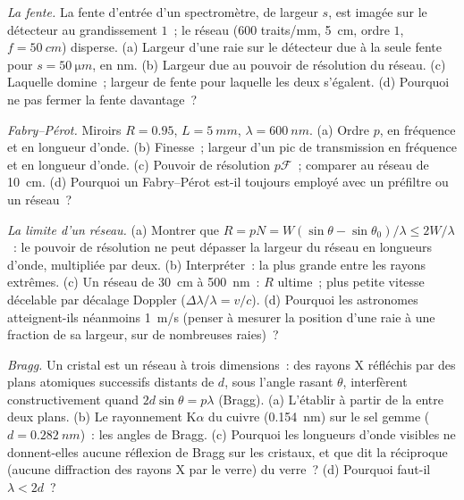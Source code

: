 \begin{exercise}[$\star\star$]\label{exo:b2:gratings:8}
\emph{La fente.} La fente d'entrée d'un spectromètre, de largeur $s$, est imagée
sur le détecteur au grandissement $1$~; le réseau ($600$ traits/mm,
\qty{5}{cm}, ordre $1$, $f = \qty{50}{cm}$) disperse. (a) Largeur d'une raie sur
le détecteur due à la seule fente pour $s = \qty{50}{\micro m}$, en nm. (b)
Largeur due au pouvoir de résolution du réseau. (c) Laquelle domine~; largeur de fente
pour laquelle les deux s'égalent. (d) Pourquoi ne pas fermer la fente davantage~?
\end{exercise}

\begin{exercise}[$\star\star$]\label{exo:b2:gratings:9}
\emph{Fabry--Pérot.} Miroirs $R = 0.95$, $L = \qty{5}{mm}$, $\lambda = \qty{600}{nm}$.
(a) Ordre $p$,  en fréquence et en longueur d'onde. (b)
Finesse~; largeur d'un pic de transmission en fréquence et en longueur d'onde. (c)
Pouvoir de résolution $p\mathcal F$~; comparer au réseau de \qty{10}{cm}. (d) Pourquoi
un Fabry--Pérot est-il toujours employé avec un préfiltre ou un réseau~?
\end{exercise}

\begin{exercise}[$\star\star\star$]\label{exo:b2:gratings:10}
\emph{La limite d'un réseau.} (a) Montrer que $R = pN = W(\sin\theta - \sin\theta_0)
/\lambda \le 2W/\lambda$~: le pouvoir de résolution ne peut dépasser la largeur du
réseau en longueurs d'onde, multipliée par deux. (b) Interpréter~: la plus grande  entre les rayons extrêmes. (c) Un réseau de \qty{30}{cm} à
\qty{500}{nm}~: $R$ ultime~; plus petite vitesse décelable par décalage Doppler
($\Delta\lambda/\lambda = v/c$). (d) Pourquoi les astronomes atteignent-ils néanmoins \qty{1}{m/s}
(penser à mesurer la position d'une raie à une fraction de sa largeur,
sur de nombreuses raies)~?
\end{exercise}

\begin{exercise}[$\star\star\star$]\label{exo:b2:gratings:11}
\emph{Bragg.} Un cristal est un réseau à trois dimensions~: des rayons X
réfléchis par des plans atomiques successifs distants de $d$, sous
l'angle rasant $\theta$, interfèrent constructivement quand $2d\sin\theta = p\lambda$
(Bragg). (a) L'établir à partir de la  entre deux plans.
(b) Le rayonnement K$\alpha$ du cuivre (\qty{0.154}{nm}) sur le sel gemme ($d = \qty{0.282}{nm}$)~:
les angles de Bragg. (c) Pourquoi les longueurs d'onde visibles ne donnent-elles aucune réflexion
de Bragg sur les cristaux, et que dit la réciproque (aucune diffraction des rayons X
par le verre) du verre~? (d) Pourquoi faut-il $\lambda < 2d$~?
\end{exercise}

